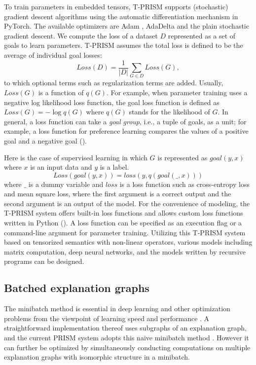 \documentclass[a4paper]{report}
\begin{document}
To train parameters in embedded tensors, T-PRISM supports (stochastic)
gradient  descent algorithms  using the automatic differentiation mechanism  in
PyTorch.  The available optimizers are Adam \cite{kingma2014adam},
AdaDelta \cite{zeiler2012adadelta} and the plain stochastic gradient descent.
We compute the loss of a dataset $D$ represented as a set
of  goals to  learn parameters.   T-PRISM  assumes the  total loss  is
defined   to    be   the average  of    individual   goal    losses:
\begin{equation}
Loss(D)=\frac{1}{|D|}\sum_{G \in D} Loss(G),
\end{equation}
to which optional terms such as regularization terms are added.
Usually, $Loss(G)$ is a function of $q(G)$. For example, when
parameter training uses a negative log likelihood loss function, the
goal loss function is defined as $Loss(G)=-\log q(G)$
where $q(G)$ stands for the likelihood of $G$.
In general, a loss function can take a {\em goal group}, i.e., a tuple of
goals, as a unit; for example, a loss function for preference learning
compares the values of a positive goal and a negative goal
().

Here is the case of supervised learning in which $G$ is represented as
$goal(y,x)$ where $x$ is an input data and $y$ is a label.
\begin{equation}
Loss(goal(y,x))=loss(y,q(goal(\_,x)))
\label{eq:loss_supervision}
\end{equation}
where $\_$ is a dummy variable and $loss$ is a loss function such as
cross-entropy loss and mean square loss, where the first argument is a
correct output and the second argument is an output of the model. For
the convenience of modeling, the T-PRISM system offers built-in loss
functions and allows custom loss functions written in Python
().  A loss function can be specified as an
execution flag or a command-line argument for parameter training.
Utilizing this T-PRISM system based on tensorized semantics with non-linear operators,
various models including matrix computation, deep neural networks, and the models written by recursive programs can be designed.

\subsection*{Batched explanation graphs}
\label{sec:batched_eg}

The  minibatch  method  is  essential   in  deep  learning  and  other
optimization  problems  from  the  viewpoint  of  learning  speed  and
performance    \cite{Goodfellow-et-al-2016}.      A    straightforward
implementation thereof uses subgraphs of an explanation graph, and the
current     PRISM    system     adopts     this    naive     minibatch
method \cite{kojima2018ijar}.  However it  can further be optimized by
simultaneously conducting computations  on multiple explanation graphs
with isomorphic structure in a minibatch.
\end{document}
